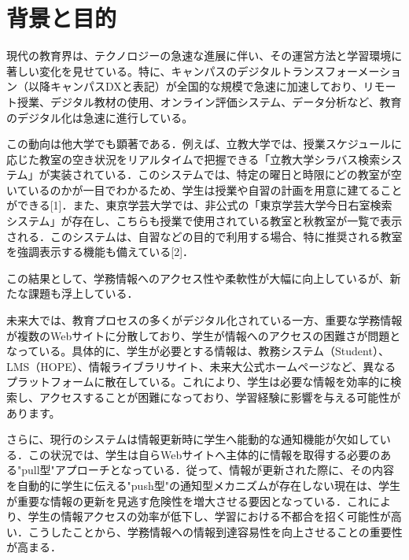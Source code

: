 \documentclass[11pt]{ujarticle}
\author{%
1020259 中村碧\\指導教員 : 松原克弥
}
\title{}
\begin{document}
\maketitle

\section{背景と目的}

現代の教育界は、テクノロジーの急速な進展に伴い、その運営方法と学習環境に著しい変化を見せている。特に、キャンパスのデジタルトランスフォーメーション（以降キャンパスDXと表記）が全国的な規模で急速に加速しており、リモート授業、デジタル教材の使用、オンライン評価システム、データ分析など、教育のデジタル化は急速に進行している。

この動向は他大学でも顕著である．例えば、立教大学では、授業スケジュールに応じた教室の空き状況をリアルタイムで把握できる「立教大学シラバス検索システム」が実装されている．このシステムでは、特定の曜日と時限にどの教室が空いているのかが一目でわかるため、学生は授業や自習の計画を用意に建てることができる[1]．また、東京学芸大学では、非公式の「東京学芸大学今日右室検索システム」が存在し、こちらも授業で使用されている教室と秋教室が一覧で表示される．このシステムは、自習などの目的で利用する場合、特に推奨される教室を強調表示する機能も備えている[2]．

この結果として、学務情報へのアクセス性や柔軟性が大幅に向上しているが、新たな課題も浮上している．

未来大では、教育プロセスの多くがデジタル化されている一方、重要な学務情報が複数のWebサイトに分散しており、学生が情報へのアクセスの困難さが問題となっている。具体的に、学生が必要とする情報は、教務システム（Student）、LMS（HOPE）、情報ライブラリサイト、未来大公式ホームページなど、異なるプラットフォームに散在している。これにより、学生は必要な情報を効率的に検索し、アクセスすることが困難になっており、学習経験に影響を与える可能性があります。

さらに、現行のシステムは情報更新時に学生へ能動的な通知機能が欠如している．この状況では、学生は自らWebサイトへ主体的に情報を取得する必要のある"pull型"アプローチとなっている．従って、情報が更新された際に、その内容を自動的に学生に伝える"push型"の通知型メカニズムが存在しない現在は、学生が重要な情報の更新を見逃す危険性を増大させる要因となっている．これにより、学生の情報アクセスの効率が低下し、学習における不都合を招く可能性が高い．こうしたことから、学務情報への情報到達容易性を向上させることの重要性が高まる．

\end{document}
